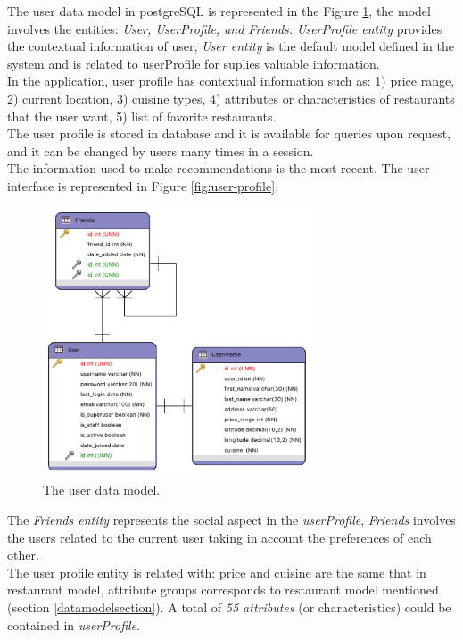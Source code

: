 The user data model in postgreSQL is represented in the 
Figure  \ref{fig:datausermodel}, the model involves the entities:
\textit{User, UserProfile, and Friends.} \textit{UserProfile entity}
provides the contextual information of user, \textit{User entity} is
the default model defined in the system and is related to userProfile
for suplies valuable information. \\
In the application, user profile has contextual
information such as: 1) price range, 2) current location, 3) cuisine
types, 4) attributes or characteristics of restaurants that the user want, 
5) list of  favorite restaurants.  \\ 
The user profile is stored in database and it is available for 
queries upon request, and it can be changed by users many times 
in a session. \\ The information used to make recommendations 
is the most recent. The user interface is represented in 
Figure  \ref{fig:user-profile}.
\begin{figure}
\captionsetup{font=footnotesize}
\centering
\includegraphics[width=8cm,height=8cm,keepaspectratio]
{img/data-usermodel.png}
\caption{The user data model.}
\label{fig:datausermodel}     
\end{figure}
The \textit{Friends entity}
represents the social aspect in the \textit{userProfile}, \textit{Friends} involves
the users related to the current user taking in account the
preferences of each other. \\The user profile entity is related with: 
price and cuisine are the same that in restaurant model,
attribute groups corresponds to restaurant model mentioned 
(section  \ref{datamodelsection}). A total of \textit{55 attributes}
(or characteristics)  could be contained in \textit{userProfile}. 
